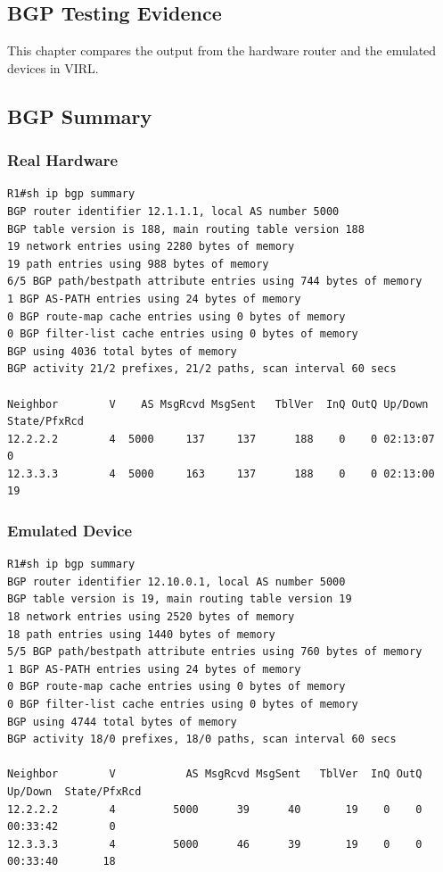\documentclass[11pt]{report}
\begin{document}
\begin{appendices}
\chapter{BGP Testing Evidence}

This chapter compares the output from the hardware router and the emulated devices in VIRL.

\section{BGP Summary}

\subsection{Real Hardware}
\begin{lstlisting}
R1#sh ip bgp summary
BGP router identifier 12.1.1.1, local AS number 5000
BGP table version is 188, main routing table version 188
19 network entries using 2280 bytes of memory
19 path entries using 988 bytes of memory
6/5 BGP path/bestpath attribute entries using 744 bytes of memory
1 BGP AS-PATH entries using 24 bytes of memory
0 BGP route-map cache entries using 0 bytes of memory
0 BGP filter-list cache entries using 0 bytes of memory
BGP using 4036 total bytes of memory
BGP activity 21/2 prefixes, 21/2 paths, scan interval 60 secs

Neighbor        V    AS MsgRcvd MsgSent   TblVer  InQ OutQ Up/Down  State/PfxRcd
12.2.2.2        4  5000     137     137      188    0    0 02:13:07        0
12.3.3.3        4  5000     163     137      188    0    0 02:13:00       19
\end{lstlisting}

\subsection{Emulated Device}
\begin{lstlisting}
R1#sh ip bgp summary
BGP router identifier 12.10.0.1, local AS number 5000
BGP table version is 19, main routing table version 19
18 network entries using 2520 bytes of memory
18 path entries using 1440 bytes of memory
5/5 BGP path/bestpath attribute entries using 760 bytes of memory
1 BGP AS-PATH entries using 24 bytes of memory
0 BGP route-map cache entries using 0 bytes of memory
0 BGP filter-list cache entries using 0 bytes of memory
BGP using 4744 total bytes of memory
BGP activity 18/0 prefixes, 18/0 paths, scan interval 60 secs

Neighbor        V           AS MsgRcvd MsgSent   TblVer  InQ OutQ Up/Down  State/PfxRcd
12.2.2.2        4         5000      39      40       19    0    0 00:33:42        0
12.3.3.3        4         5000      46      39       19    0    0 00:33:40       18
\end{lstlisting}


\end{appendices}
\end{document}
